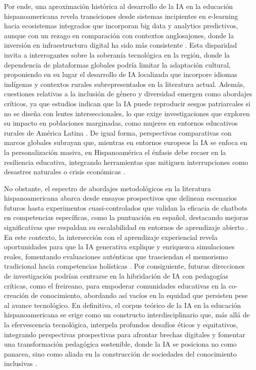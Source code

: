 \documentclass[spanish]{textolivre}
\begin{document}
Por ende, una aproximación histórica al desarrollo de la IA en la educación hispanoamericana revela transiciones desde sistemas incipientes en e-learning hacia ecosistemas integrados que incorporan big data y analytics predictivos, aunque con un rezago en comparación con contextos anglosajones, donde la inversión en infraestructura digital ha sido más consistente \cite{hinojolucena2019}. Esta disparidad invita a interrogantes sobre la soberanía tecnológica en la región, donde la dependencia de plataformas globales podría limitar la adaptación cultural, proponiendo en su lugar el desarrollo de IA localizada que incorpore idiomas indígenas y contextos rurales subrepresentados en la literatura actual. Además, cuestiones relativas a la inclusión de género y diversidad emergen como abordajes críticos, ya que estudios indican que la IA puede reproducir sesgos patriarcales si no se diseña con lentes interseccionales, lo que exige investigaciones que exploren su impacto en poblaciones marginadas, como mujeres en entornos educativos rurales de América Latina \cite{catalanpesce2010, monterogutenberg2021}. De igual forma, perspectivas comparativas con marcos globales subrayan que, mientras en entornos europeos la IA se enfoca en la personalización masiva, en Hispanoamérica el énfasis debe recaer en la resiliencia educativa, integrando herramientas que mitiguen interrupciones como desastres naturales o crisis económicas \cite{barrioscedeno2025, catalanpesce2024}.

No obstante, el espectro de abordajes metodológicos en la literatura hispanoamericana abarca desde ensayos prospectivos que delinean escenarios futuros hasta experimentos cuasi-controlados que validan la eficacia de chatbots en competencias específicas, como la puntuación en español, destacando mejoras significativas que respaldan su escalabilidad en entornos de aprendizaje abierto \cite{vazquezcano2021, garciapenalvo2024}. En este contexto, la intersección con el aprendizaje experiencial revela oportunidades para que la IA generativa explique y enriquezca simulaciones reales, fomentando evaluaciones auténticas que trasciendan el memorismo tradicional hacia competencias holísticas \cite{salinasnavarro2024}. Por consiguiente, futuras direcciones de investigación podrían centrarse en la hibridación de IA con pedagogías críticas, como el freireano, para empoderar comunidades educativas en la co-creación de conocimiento, abordando así vacíos en la equidad que persisten pese al avance tecnológico. En definitiva, el corpus teórico de la IA en la educación hispanoamericana se erige como un constructo interdisciplinario que, más allá de la efervescencia tecnológica, interpela profundos desafíos éticos y equitativos, integrando perspectivas prospectivas para afrontar brechas digitales y fomentar una transformación pedagógica sostenible, donde la IA se posiciona no como panacea, sino como aliada en la construcción de sociedades del conocimiento inclusivas \cite{michelvillarreal2023}.
\end{document}
